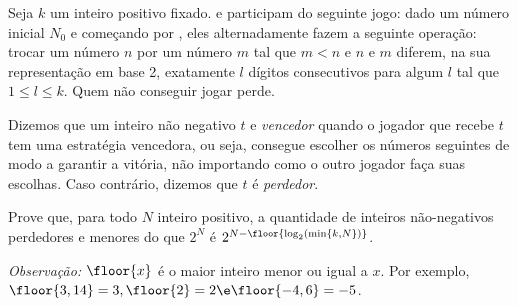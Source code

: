 Seja $k$ um inteiro positivo fixado.  e  participam do seguinte jogo:
dado um número inicial $N_0$ e começando por , eles alternadamente fazem a seguinte operação:
trocar um número $n$ por um número $m$ tal que $m < n$ e $n$ e $m$ diferem, na sua representação em base 2, exatamente $l$ dígitos consecutivos para algum $l$ tal que $1 \le l \le k$. Quem não conseguir jogar perde.

Dizemos que um inteiro não negativo $t$ e \textit{vencedor} quando o jogador que recebe $t$ tem uma estratégia vencedora, ou seja, consegue escolher os números seguintes de modo a garantir a vitória, não importando como o outro jogador faça suas escolhas. Caso contrário, dizemos que $t$ é \textit{perdedor}.

Prove que, para todo $N$ inteiro positivo, a quantidade de inteiros não-negativos perdedores e menores do que $2^N$ é $2^{N-\floor{\log_2(\mathrm{min}\{k, N\})}}$.

\textit{Observação:} $\floor{x}$ é o maior inteiro menor ou igual a $x$. Por exemplo, $\floor{3,14} = 3, \floor{2} = 2 \e \floor{-4,6} = -5$.